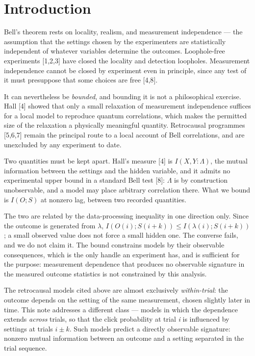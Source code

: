 \documentclass[
  11pt,
]{article}
\begin{document}
\section{Introduction}

Bell's theorem rests on locality, realism, and measurement independence
--- the assumption that the settings chosen by the experimenters are
statistically independent of whatever variables determine the outcomes.
Loophole-free experiments {[}1,2,3{]} have closed the locality and
detection loopholes. Measurement independence cannot be closed by
experiment even in principle, since any test of it must presuppose that
some choices are free {[}4,8{]}.

It can nevertheless be \emph{bounded}, and bounding it is not a
philosophical exercise. Hall {[}4{]} showed that only a small relaxation
of measurement independence suffices for a local model to reproduce
quantum correlations, which makes the permitted size of the relaxation a
physically meaningful quantity. Retrocausal programmes {[}5,6,7{]}
remain the principal route to a local account of Bell correlations, and
are unexcluded by any experiment to date.

Two quantities must be kept apart. Hall's measure {[}4{]} is
\(I(X,Y:\Lambda)\), the mutual information between the settings and the
hidden variable, and it admits no experimental upper bound in a standard
Bell test {[}8{]}: \(\Lambda\) is by construction unobservable, and a
model may place arbitrary correlation there. What we bound is \(I(O;S)\)
at nonzero lag, between two recorded quantities.

The two are related by the data-processing inequality in one direction
only. Since the outcome is generated from \(\lambda\),
\(I(O(i);S(i+k)) \le I(\lambda(i);S(i+k))\); a small observed value does
not force a small hidden one. The converse fails, and we do not claim
it. The bound constrains models by their observable consequences, which
is the only handle an experiment has, and is sufficient for the purpose:
measurement dependence that produces no observable signature in the
measured outcome statistics is not constrained by this analysis.

The retrocausal models cited above are almost exclusively
\emph{within-trial}: the outcome depends on the setting of the same
measurement, chosen slightly later in time. This note addresses a
different class --- models in which the dependence extends \emph{across}
trials, so that the click probability at trial \emph{i} is influenced by
settings at trials \(i \pm k\). Such models predict a directly
observable signature: nonzero mutual information between an outcome and
a setting separated in the trial sequence.
\end{document}
